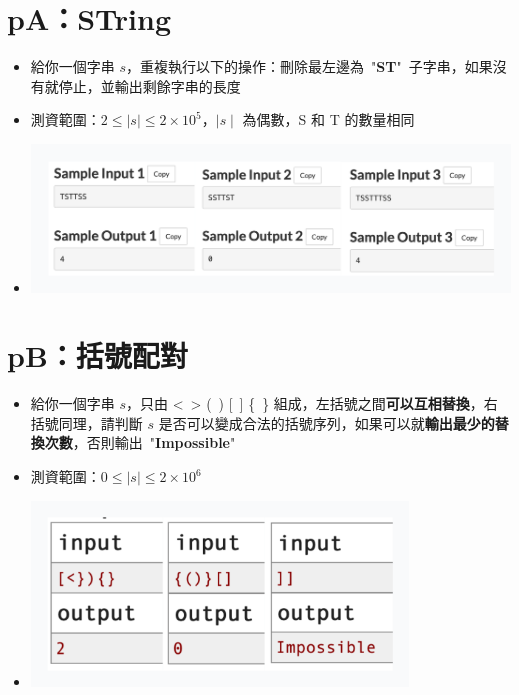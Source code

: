 \documentclass[12pt]{article}
\begin{document}
\section*{pA：STring}

\begin{itemize}[label={}, itemsep=0pt]
    \item 給你一個字串 $s$，重複執行以下的操作：刪除最左邊為\ "\textbf{ST}"\ 子字串，如果沒有就停止，並輸出剩餘字串的長度
    \item 測資範圍：$2 \leq \mid s \mid \leq 2 \times 10^5$，$\mid s \mid$ 為偶數，S 和 T 的數量相同
    \item \begin{center}\includegraphics[width=18.0cm]{img/pA}\end{center}
\end{itemize}

\section*{pB：括號配對}

\begin{itemize}[label={}, itemsep=0pt]
    \item 給你一個字串 $s$，只由 <\ > (\ ) [\ ] \{\ \} 組成，左括號之間\textbf{可以互相替換}，右括號同理，請判斷 $s$ 是否可以變成合法的括號序列，如果可以就\textbf{輸出最少的替換次數}，否則輸出\ "\textbf{Impossible}"
    \item 測資範圍：$0 \leq \mid s \mid \leq 2 \times 10^6$
    \item \begin{center}\includegraphics[width=10.0cm]{img/pB}\end{center}
\end{itemize}
\end{document}
